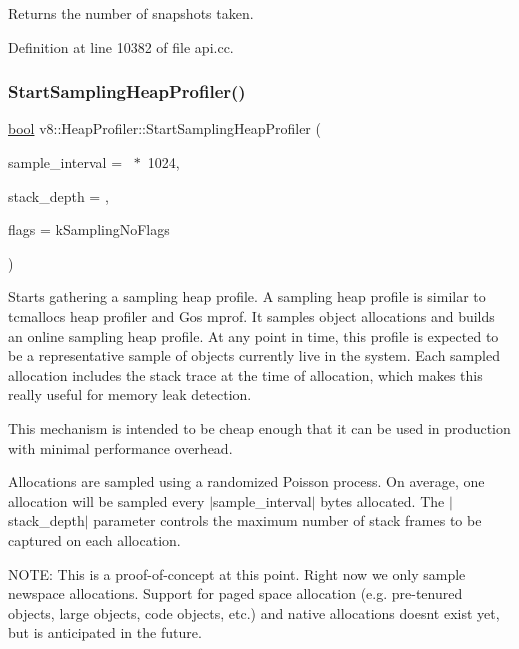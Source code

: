 Returns the number of snapshots taken. 

Definition at line 10382 of file api.\+cc.

\mbox{\label{classv8_1_1HeapProfiler_a6b9450bbf1f4e1a4909df92d4df4a174}} 
\subsubsection{\texorpdfstring{Start\+Sampling\+Heap\+Profiler()}{StartSamplingHeapProfiler()}}
{\footnotesize\ttfamily \mbox{\hyperlink{classbool}{bool}} v8\+::\+Heap\+Profiler\+::\+Start\+Sampling\+Heap\+Profiler (\begin{DoxyParamCaption}\item[{uint64\+\_\+t}]{sample\+\_\+interval = {~$\ast$~1024},  }\item[{\mbox{\hyperlink{classint}{int}}}]{stack\+\_\+depth = {},  }\item[{Sampling\+Flags}]{flags = {\ttfamily kSamplingNoFlags} }\end{DoxyParamCaption})}

Starts gathering a sampling heap profile. A sampling heap profile is similar to tcmalloc\textquotesingle{}s heap profiler and Go\textquotesingle{}s mprof. It samples object allocations and builds an online \textquotesingle{}sampling\textquotesingle{} heap profile. At any point in time, this profile is expected to be a representative sample of objects currently live in the system. Each sampled allocation includes the stack trace at the time of allocation, which makes this really useful for memory leak detection.

This mechanism is intended to be cheap enough that it can be used in production with minimal performance overhead.

Allocations are sampled using a randomized Poisson process. On average, one allocation will be sampled every $\vert$sample\+\_\+interval$\vert$ bytes allocated. The $\vert$stack\+\_\+depth$\vert$ parameter controls the maximum number of stack frames to be captured on each allocation.

N\+O\+TE\+: This is a proof-\/of-\/concept at this point. Right now we only sample newspace allocations. Support for paged space allocation (e.\+g. pre-\/tenured objects, large objects, code objects, etc.) and native allocations doesn\textquotesingle{}t exist yet, but is anticipated in the future.

